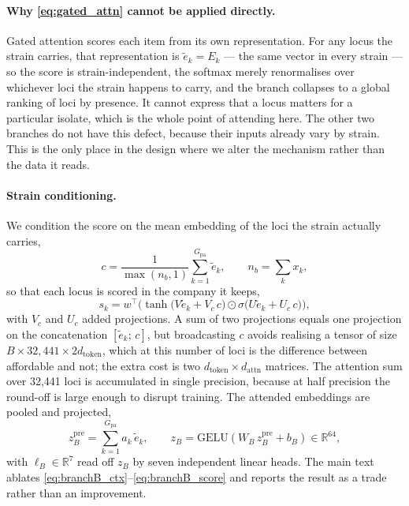 \documentclass[11pt]{article}
\begin{document}
\paragraph{Why \eqref{eq:gated_attn} cannot be applied directly.} Gated attention scores each item
from its own representation. For any locus the strain carries, that representation is
$\tilde{e}_k = E_k$ --- the same vector in every strain --- so the score is strain-independent, the
softmax merely renormalises over whichever loci the strain happens to carry, and the branch
collapses to a global ranking of loci by presence. It cannot express that a locus matters for a
particular isolate, which is the whole point of attending here. The other two branches do not have
this defect, because their inputs already vary by strain. This is the only place in the design where
we alter the mechanism rather than the data it reads.

\paragraph{Strain conditioning.} We condition the score on the mean embedding of the loci the strain
actually carries,
\begin{equation}
c = \frac{1}{\max(n_b, 1)} \sum_{k=1}^{G_{\mathrm{pa}}} \tilde{e}_k,
\qquad n_b = \sum_k x_k,
\label{eq:branchB_ctx}
\end{equation}
so that each locus is scored in the company it keeps,
\begin{equation}
s_k = w^\top\Big(\tanh\big(V \tilde{e}_k + V_c\, c\big) \odot
\sigma\big(U \tilde{e}_k + U_c\, c\big)\Big),
\label{eq:branchB_score}
\end{equation}
with $V_c$ and $U_c$ added projections. A sum of two projections equals one projection on the
concatenation $[\tilde{e}_k;\, c]$, but broadcasting $c$ avoids realising a tensor of size
$B \times 32{,}441 \times 2 d_{\mathrm{token}}$, which at this number of loci is the difference
between affordable and not; the extra cost is two
$d_{\mathrm{token}} \times d_{\mathrm{attn}}$ matrices. The attention sum over 32,441 loci is
accumulated in single precision, because at half precision the round-off is large enough to disrupt
training. The attended embeddings are pooled and projected,
\begin{equation}
z_B^{\mathrm{pre}} = \sum_{k=1}^{G_{\mathrm{pa}}} a_k\, \tilde{e}_k,
\qquad
z_B = \mathrm{GELU}\!\left(W_B\, z_B^{\mathrm{pre}} + b_B\right) \in \mathbb{R}^{64},
\label{eq:branchB_out}
\end{equation}
with $\ell_B \in \mathbb{R}^{7}$ read off $z_B$ by seven independent linear heads. The main text
ablates \eqref{eq:branchB_ctx}--\eqref{eq:branchB_score} and reports the result as a trade rather
than an improvement.
\end{document}
